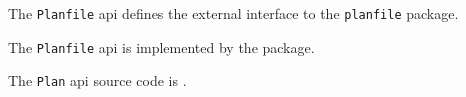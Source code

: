 The {\tt Planfile} api defines the external interface to the {\tt planfile} package.

The {\tt Planfile} api is implemented by the  package.

The {\tt Plan} api source code is .

